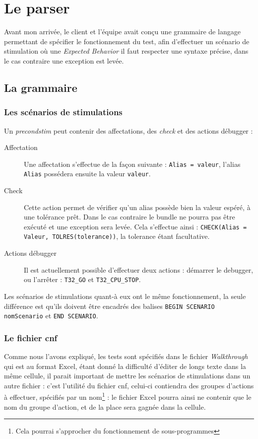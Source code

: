	\section{Le parser}\label{sectionParser}
	Avant mon arrivée, le client et l'équipe avait conçu une grammaire de langage permettant de spécifier le fonctionnement du test, afin d'effectuer un scénario de stimulation où une \textit{Expected Behavior} il faut respecter une syntaxe précise, dans le cas contraire une exception est levée.

	\subsection{La grammaire}
	\subsubsection{Les scénarios de stimulations}
	Un \textit{precondstim} peut contenir des affectations, des \textit{check} et des actions débugger : 
	\begin{description}
		\item[Affectation] Une affectation s'effectue de la façon suivante : \texttt{Alias = valeur}, l'alias \texttt{Alias} possédera ensuite la valeur \texttt{valeur}.
		\item[Check] Cette action permet de vérifier qu'un alias possède bien la valeur espéré, à une tolérance prêt. Dans le cas contraire le bundle ne pourra pas être exécuté et une exception sera levée. Cela s'effectue ainsi : \texttt{CHECK(Alias = Valeur, TOLRES(tolerance))}, la tolerance étant facultative.
		\item[Actions débugger] Il est actuellement possible d'effectuer deux actions : démarrer le debugger, ou l'arrêter : \texttt{T32\_GO} et 
		\texttt{T32\_CPU\_STOP}.
	\end{description}

	Les scénarios de stimulations quant-à eux ont le même fonctionnement, la seule différence est qu'ils doivent être encadrés des balises \texttt{BEGIN SCENARIO nomScenario} et \texttt{END SCENARIO}.

	\subsubsection{Le fichier cnf}
	Comme nous l'avons expliqué, les tests sont spécifiés dans le fichier \textit{Walkthrough} qui est au format Excel, étant donné la difficulté d'éditer de longs texte dans la même cellule, il parait important de mettre les scénarios de stimulations dans un autre fichier : c'est l'utilité du fichier cnf, celui-ci contiendra des groupes d'actions à effectuer, spécifiés par un nom\footnote{Cela pourrai s'approcher du fonctionnement de sous-programmes} : le fichier Excel pourra ainsi ne contenir que le nom du groupe d'action, et de la place sera gagnée dans la cellule.

